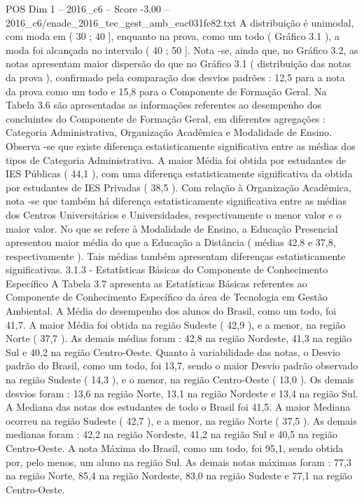 \begin{textsample}{POS Dim 1 – 2016\_c6 – Score -3.00 – 2016\_c6/enade\_2016\_tec\_gest\_amb\_eac031fe82.txt}
A distribuição é unimodal, com moda em ( 30 ; 40 ], enquanto na prova, como um todo ( Gráfico 3.1 ), a moda foi alcançada no intervalo ( 40 ; 50 ].
Nota -se, ainda que, no Gráfico 3.2, as notas apresentam maior dispersão do que no Gráfico 3.1 ( distribuição das notas da prova ), confirmado pela comparação dos desvios padrões : 12,5 para a nota da prova como um todo e 15,8 para o Componente de Formação Geral.
Na Tabela 3.6 são apresentadas as informações referentes ao desempenho dos concluintes do Componente de Formação Geral, em diferentes agregações : Categoria Administrativa, Organização Acadêmica e Modalidade de Ensino.
Observa -se que existe diferença estatisticamente significativa entre as médias dos tipos de Categoria Administrativa.
A maior Média foi obtida por estudantes de IES Públicas ( 44,1 ), com uma diferença estatisticamente significativa da obtida por estudantes de IES Privadas ( 38,5 ).
Com relação à Organização Acadêmica, nota -se que também há diferença estatisticamente significativa entre as médias dos Centros Universitários e Universidades, respectivamente o menor valor e o maior valor.
No que se refere à Modalidade de Ensino, a Educação Presencial apresentou maior média do que a Educação a Distância ( médias 42,8 e 37,8, respectivamente ).
Tais médias também apresentam diferenças estatisticamente significativas. 3.1.3 - Estatísticas Básicas do Componente de Conhecimento Específico A Tabela 3.7 apresenta as Estatísticas Básicas referentes ao Componente de Conhecimento Específico da área de Tecnologia em Gestão Ambiental.
A Média do desempenho dos alunos do Brasil, como um todo, foi 41,7.
A maior Média foi obtida na região Sudeste ( 42,9 ), e a menor, na região Norte ( 37,7 ).
As demais médias foram : 42,8 na região Nordeste, 41,3 na região Sul e 40,2 na região Centro-Oeste.
Quanto à variabilidade das notas, o Desvio padrão do Brasil, como um todo, foi 13,7, sendo o maior Desvio padrão observado na região Sudeste ( 14,3 ), e o menor, na região Centro-Oeste ( 13,0 ).
Os demais desvios foram : 13,6 na região Norte, 13,1 na região Nordeste e 13,4 na região Sul.
A Mediana das notas dos estudantes de todo o Brasil foi 41,5.
A maior Mediana ocorreu na região Sudeste ( 42,7 ), e a menor, na região Norte ( 37,5 ).
As demais medianas foram : 42,2 na região Nordeste, 41,2 na região Sul e 40,5 na região Centro-Oeste.
A nota Máxima do Brasil, como um todo, foi 95,1, sendo obtida por, pelo menos, um aluno na região Sul.
As demais notas máximas foram : 77,3 na região Norte, 85,4 na região Nordeste, 83,0 na região Sudeste e 77,1 na região Centro-Oeste.

\end{textsample}
